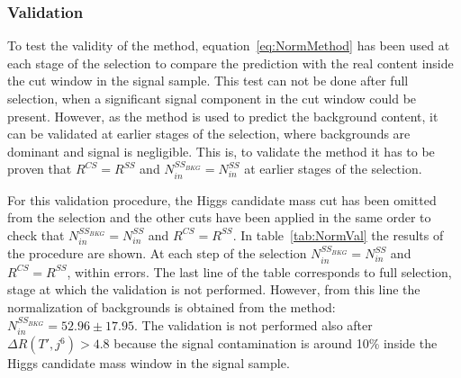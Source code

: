 \subsubsection{Validation}
\label{sec:normval}

To test the validity of the method, equation~\ref{eq:NormMethod} has been used at each stage of the selection to compare the prediction with the real content inside the cut window in the signal sample. This test can not be done after full selection, when a significant signal component in the cut window could be present. However, as the method is used to predict the background content, it can be validated at earlier stages of the selection, where backgrounds are dominant and signal is negligible. This is, to validate the method it has to be proven that $R^{CS}=R^{SS}$ and $N^{SS_{BKG}}_{in}=N^{SS}_{in}$ at earlier stages of the selection.

For this validation procedure, the Higgs candidate mass cut has been omitted from the selection and the other cuts have been applied in the same order to check that $N^{SS_{BKG}}_{in}=N^{SS}_{in}$ and $R^{CS}=R^{SS}$. In table~\ref{tab:NormVal} the results of the procedure are shown. At each step of the selection $N^{SS_{BKG}}_{in}=N^{SS}_{in}$ and $R^{CS}=R^{SS}$, within errors. The last line of the table corresponds to full selection, stage at which the validation is not performed. However, from this line the normalization of backgrounds is obtained from the method: $N^{SS_{BKG}}_{in}=52.96\pm17.95$. The validation is not performed also after $ \Delta R (T',j^{6})>4.8$ because the signal contamination is around 10\% inside the Higgs candidate mass window in the signal sample.

